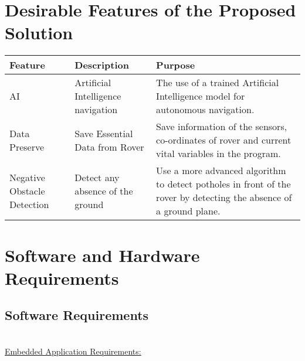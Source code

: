 \documentclass[11pt]{report}
\begin{document}
\section{Desirable Features of the Proposed Solution}
	\begin{tabularx}{1\textwidth} { 
		  | >{\centering\arraybackslash}X 
		  | >{\centering\arraybackslash}X 
		  | >{\centering\arraybackslash}X | }
			 \hline
			 	\textbf{Feature} & \textbf{Description} & \textbf{Purpose} \\
			 \hline
			 	AI  & Artificial Intelligence navigation  & The use of a trained Artificial Intelligence model for autonomous navigation.  \\
			 \hline
			 	Data Preserve & Save Essential Data from Rover & Save information of the sensors, co-ordinates of rover and current vital variables in the program. \\
			 \hline
			 	Negative Obstacle Detection & Detect any absence of the ground & Use a more advanced algorithm to detect potholes in front of the rover by detecting the absence of a ground plane. \\
			\hline
	\end{tabularx}


\section{Software and Hardware Requirements}

	\subsection{Software Requirements}
		~\\
		\underline{Embedded Application Requirements:}
\end{document}
